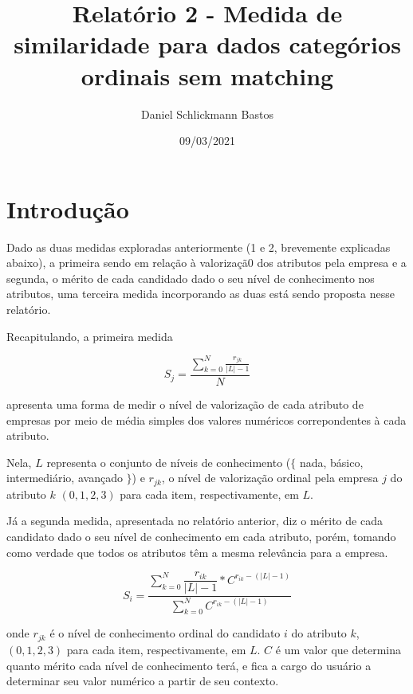 \documentclass[]{article}
\title{Relatório 2 - Medida de similaridade para dados categórios ordinais sem matching}
\author[1]{Daniel Schlickmann Bastos}
\date{09/03/2021}
\begin{document}
	\maketitle
	
	\section{Introdução}
	
	Dado as duas medidas exploradas anteriormente (1 e 2, brevemente explicadas abaixo), a primeira sendo em relação à valorizaçã0 dos atributos pela empresa e a segunda, o mérito de cada candidado dado o seu nível de conhecimento nos atributos, uma terceira medida incorporando as duas está sendo proposta nesse relatório.
	
	Recapitulando, a primeira medida
	
	\begin{center}
		\begin{equation}
			S_j = \dfrac{\sum_{k = 0}^N \frac{r_{jk}}{|L| - 1}}{N}
		\end{equation}	
	\end{center}
	
	apresenta uma forma de medir o nível de valorização de cada atributo de empresas por meio de média simples dos valores numéricos correpondentes à cada atributo.
	
	Nela, $L$ representa o conjunto de níveis de conhecimento ($\{$ nada, básico, intermediário, avançado $\}$) e $r_{jk}$, o nível de valorização ordinal pela empresa $j$ do atributo $k$ $(0, 1, 2, 3)$ para cada item, respectivamente, em $L$.
	
	Já a segunda medida, apresentada no relatório anterior, diz o mérito de cada candidato dado o seu nível de conhecimento em cada atributo, porém, tomando como verdade que todos os atributos têm a mesma relevância para a empresa. 
	
	\begin{center}
		\begin{equation}
			S_i = \dfrac{\sum_{k = 0}^N \dfrac{r_{ik}}{|L| - 1} * C^{r_{ik} - (|L| - 1)}}{\sum_{k = 0}^N C^{r_{ik} - (|L| - 1)}}
		\end{equation}		
	\end{center}
	
	onde $r_{jk}$ é o nível de conhecimento ordinal do candidato $i$ do atributo $k$, $(0, 1, 2, 3)$ para cada item, respectivamente, em $L$. $ C $ é um valor que determina quanto mérito cada nível de conhecimento terá, e fica a cargo do usuário a determinar seu valor numérico a partir de seu contexto.
	
\end{document}
